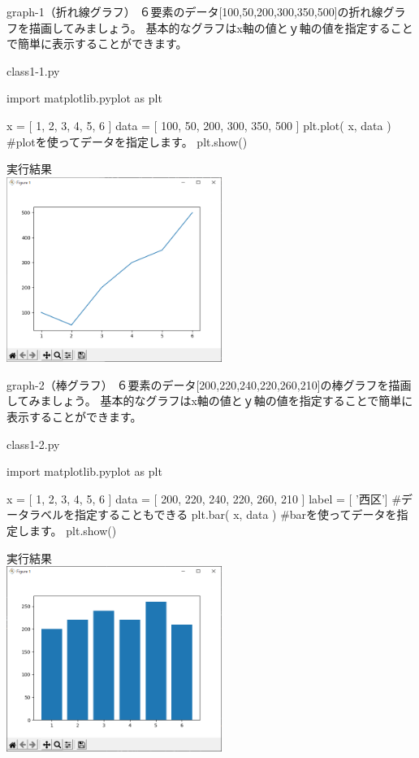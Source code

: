 \begin{pabox}{graph-1（折れ線グラフ）}
６要素のデータ[100,50,200,300,350,500]の折れ線グラフを描画してみましょう。
基本的なグラフはx軸の値とｙ軸の値を指定することで簡単に表示することができます。
\begin{legbox}{class1-1.py}
\begin{listing}{1}
import matplotlib.pyplot as plt

x = [ 1, 2, 3, 4, 5, 6 ]
data = [ 100, 50, 200, 300, 350, 500 ]
plt.plot( x, data )
#plotを使ってデータを指定します。
plt.show()
\end{listing}


実行結果\\

\includegraphics[width=7cm]{images/graph1.png} 

\end{legbox}
\end{pabox}

\begin{pabox}{graph-2（棒グラフ）}
６要素のデータ[200,220,240,220,260,210]の棒グラフを描画してみましょう。
基本的なグラフはx軸の値とｙ軸の値を指定することで簡単に表示することができます。
\begin{legbox}{class1-2.py}
\begin{listing}{1}
import matplotlib.pyplot as plt

x = [ 1, 2, 3, 4, 5, 6 ]
data = [ 200, 220, 240, 220, 260, 210 ]
label = [ '西区']
#データラベルを指定することもできる
plt.bar( x, data )
#barを使ってデータを指定します。
plt.show()
\end{listing}


実行結果\\

\includegraphics[width=7cm]{images/graph2.png} 

\end{legbox}
\end{pabox}


